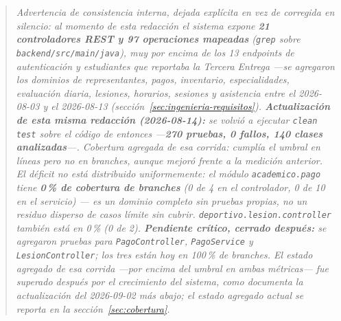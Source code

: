 \documentclass[11pt,a4paper]{article}
\newcommand{\ruta}[1]{\texttt{\footnotesize #1}}
\begin{document}
\begin{quote}
\small\itshape\color{alerta}
Advertencia de consistencia interna, dejada explícita en vez de
corregida en silencio: al momento de esta redacción el sistema expone
\textbf{21 controladores REST y 97 operaciones \emph{mapeadas}}
(\texttt{grep} sobre \ruta{backend/src/main/java}), muy por encima de
los 13 \emph{endpoints} de autenticación y estudiantes que reportaba la
Tercera Entrega —se agregaron los dominios de representantes, pagos,
inventario, especialidades, evaluación diaria, lesiones, horarios,
sesiones y asistencia entre el 2026-08-03 y el 2026-08-13
(sección~\ref{sec:ingenieria-requisitos}). \textbf{Actualización de esta
misma redacción (2026-08-14):} se volvió a ejecutar \texttt{clean test}
sobre el código de entonces —\textbf{270 pruebas, 0 fallos, 140 clases
analizadas}—. Cobertura agregada de esa corrida: cumplía el umbral en
líneas pero no en \emph{branches}, aunque mejoró frente a la medición
anterior. El déficit no está distribuido
uniformemente: el módulo \texttt{academico.pago} tiene \textbf{0\,\% de
cobertura de \emph{branches}} (0 de 4 en el controlador, 0 de 10 en el
servicio) — es un dominio completo sin pruebas propias, no un residuo
disperso de casos límite sin cubrir. \texttt{deportivo.lesion.controller}
también está en 0\,\% (0 de 2). \textbf{Pendiente crítico, cerrado
después:} se agregaron pruebas para \texttt{PagoController},
\texttt{PagoService} y \texttt{LesionController}; los tres están hoy en
100\,\% de \emph{branches}. El estado agregado de esa corrida —por
encima del umbral en ambas métricas— fue superado después
por el crecimiento del sistema, como documenta la actualización del
2026-09-02 más abajo; el estado agregado \emph{actual} se reporta en la
sección~\ref{sec:cobertura}.


\end{quote}
\end{document}
